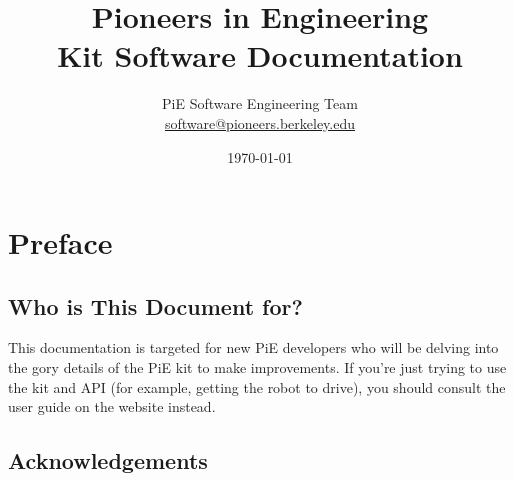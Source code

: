 \documentclass[12pt]{book}
\title{Pioneers in Engineering \\ Kit Software Documentation}
\author{PiE Software Engineering Team \\ \url{software@pioneers.berkeley.edu}}
\date{\today}
\begin{document}
  \frontmatter
  \maketitle
  \tableofcontents

  \chapter{Preface}

  \section{Who is This Document for?}

  This documentation is targeted for new PiE developers who will be delving into the gory details of the PiE kit to make improvements.
  If you're just trying to use the kit and API (for example, getting the robot to drive), you should consult the user guide on the website instead.

  \section{Acknowledgements}
\end{document}
